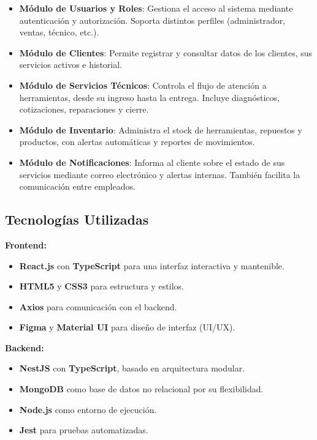 \begin{itemize}
	\item \textbf{Módulo de Usuarios y Roles}: Gestiona el acceso al sistema mediante autenticación y autorización. Soporta distintos perfiles (administrador, ventas, técnico, etc.).

	\item \textbf{Módulo de Clientes}: Permite registrar y consultar datos de los clientes, sus servicios activos e historial.

	\item \textbf{Módulo de Servicios Técnicos}: Controla el flujo de atención a herramientas, desde su ingreso hasta la entrega. Incluye diagnósticos, cotizaciones, reparaciones y cierre.

	\item \textbf{Módulo de Inventario}: Administra el stock de herramientas, repuestos y productos, con alertas automáticas y reportes de movimientos.

	\item \textbf{Módulo de Notificaciones}: Informa al cliente sobre el estado de sus servicios mediante correo electrónico y alertas internas. También facilita la comunicación entre empleados.
\end{itemize}

\subsection{Tecnologías Utilizadas}

\textbf{Frontend:}
\begin{itemize}
	\item \textbf{React.js} con \textbf{TypeScript} para una interfaz interactiva y mantenible.
	\item \textbf{HTML5} y \textbf{CSS3} para estructura y estilos.
	\item \textbf{Axios} para comunicación con el backend.
	\item \textbf{Figma} y \textbf{Material UI} para diseño de interfaz (UI/UX).
\end{itemize}

\textbf{Backend:}
\begin{itemize}
	\item \textbf{NestJS} con \textbf{TypeScript}, basado en arquitectura modular.
	\item \textbf{MongoDB} como base de datos no relacional por su flexibilidad.
	\item \textbf{Node.js} como entorno de ejecución.
	\item \textbf{Jest} para pruebas automatizadas.
\end{itemize}

